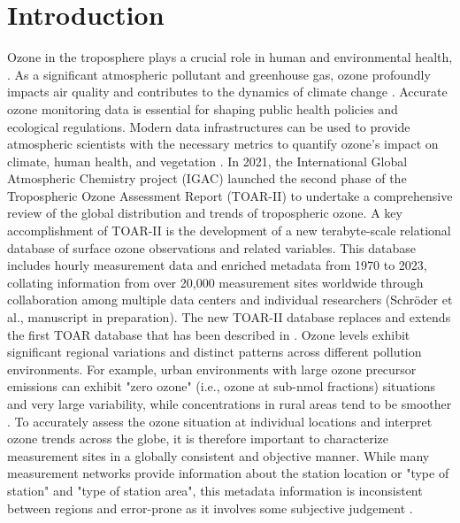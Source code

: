 \documentclass[gmd, manuscript]{copernicus}
\begin{document}
\section{Introduction} 
Ozone in the troposphere plays a crucial role in human and environmental health, \citep{post2012variation, griffiths2021tropospheric}. As a significant atmospheric pollutant and greenhouse gas, ozone profoundly impacts air quality and contributes to the dynamics of climate change  \citep{madronich2023changes, orru2013impact}.
Accurate ozone monitoring data is essential for shaping public health policies and ecological regulations. Modern data infrastructures can be used to provide atmospheric scientists with the necessary metrics to quantify ozone's impact on climate, human health, and vegetation \citep{gaudel2018tropospheric, flemingchapter, mills2018nitrogen, teakles2017impacts, cooper2014global, monks2015tropospheric, schultz2015global}. 
In 2021, the International Global Atmospheric Chemistry project (IGAC) launched the second phase of the Tropospheric Ozone Assessment Report (TOAR-II) to undertake a comprehensive review of the global distribution and trends of tropospheric ozone. A key accomplishment of TOAR-II is the development of a new terabyte-scale relational database of surface ozone observations and related variables. This database includes hourly measurement data and enriched metadata from 1970 to 2023, collating information from over 20,000 measurement sites worldwide through collaboration among multiple data centers and individual researchers (Schröder et al., manuscript in preparation). The new TOAR-II database replaces and extends the first TOAR database that has been described in \cite{schultz2017tropospheric}. 
Ozone levels exhibit significant regional variations and distinct patterns across different pollution environments. For example, urban environments with large ozone precursor emissions can exhibit "zero ozone" (i.e., ozone at sub-nmol fractions) situations and very large variability, while concentrations in rural areas tend to be smoother \citep{zhou2022spatiotemporal, Schultz2017}. To accurately assess the ozone situation at individual locations and interpret ozone trends across the globe, it is therefore important to characterize measurement sites in a globally consistent and objective manner. While many measurement networks provide information about the station location or "type of station" and "type of station area", %
this metadata information is inconsistent between regions and error-prone as it involves some subjective judgement \citep[c.f.,][]{tapia2016new}. 
\end{document}
